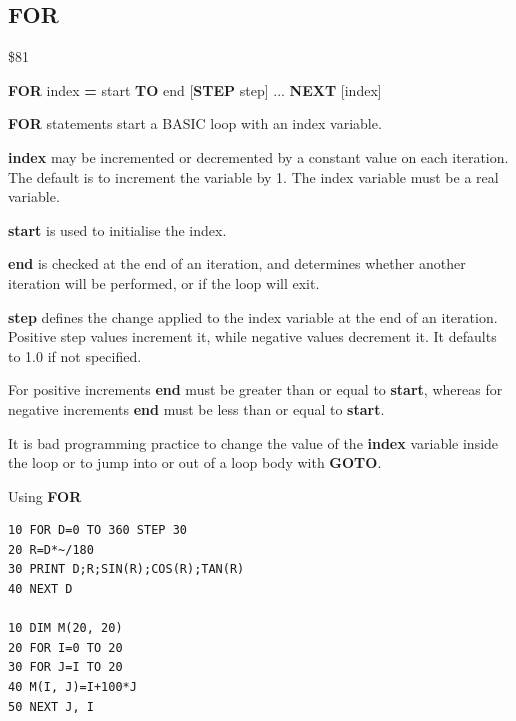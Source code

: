 \subsection{FOR}
\begin{description}[leftmargin=2cm,style=nextline]
\item [Token:]    \$81

\item [Format:]   {\bf FOR} index {\bf=} start {\bf TO} end	[{\bf STEP} step] ... {\bf NEXT} [index]

\item [Usage:]    {\bf FOR} statements start a BASIC loop with an index variable.

                  {\bf index} may be incremented or decremented by a constant value on each iteration. The default is to increment the variable by 1. The index variable must be a real variable.

                  {\bf start} is used to initialise the index.

                  {\bf end} is checked at the end of an iteration, and determines whether another iteration will be performed, or if the loop will exit.

                  {\bf step} defines the change applied to the index variable at the end of an iteration. Positive step values increment it, while negative values decrement it. It defaults to 1.0 if not specified.

\item [Remarks:]  For positive increments {\bf end} must be greater than or equal to {\bf start}, whereas for negative increments {\bf end} must be less than or equal to {\bf start}.

                  It is bad programming practice to change the value of the {\bf index} variable inside the loop or to jump into or out of a loop body with {\bf GOTO}.

\item [Examples:] Using {\bf FOR}

\begin{tcolorbox}[colback=black,coltext=white]
\verbatimfont{\codefont}
\begin{verbatim}
10 FOR D=0 TO 360 STEP 30
20 R=D*~/180
30 PRINT D;R;SIN(R);COS(R);TAN(R)
40 NEXT D

10 DIM M(20, 20)
20 FOR I=0 TO 20
30 FOR J=I TO 20
40 M(I, J)=I+100*J
50 NEXT J, I
\end{verbatim}
\end{tcolorbox}
\end{description}

